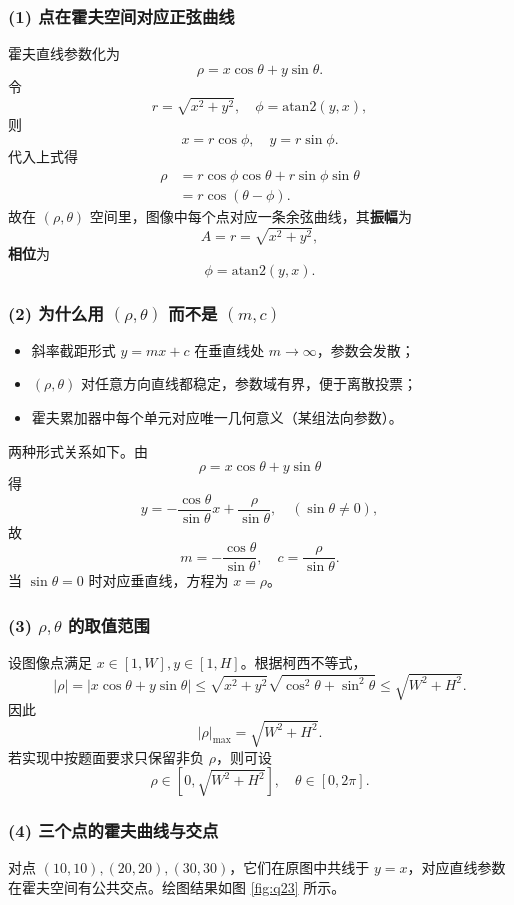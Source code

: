 \documentclass[12pt,a4paper]{ctexart}
\begin{document}
\subsubsection*{(1) 点在霍夫空间对应正弦曲线}
霍夫直线参数化为
\begin{equation}
\rho = x\cos\theta + y\sin\theta.
\end{equation}
令
\[
r=\sqrt{x^2+y^2},\quad \phi=\mathrm{atan2}(y,x),
\]
则
\[
x=r\cos\phi,\quad y=r\sin\phi.
\]
代入上式得
\begin{align}
\rho &= r\cos\phi\cos\theta + r\sin\phi\sin\theta \\
&= r\cos(\theta-\phi).
\end{align}
故在 $(\rho,\theta)$ 空间里，图像中每个点对应一条余弦曲线，其\textbf{振幅}为
\[
A=r=\sqrt{x^2+y^2},
\]
\textbf{相位}为
\[
\phi=\mathrm{atan2}(y,x).
\]

\subsubsection*{(2) 为什么用 $(\rho,\theta)$ 而不是 $(m,c)$}
\begin{itemize}
    \item 斜率截距形式 $y=mx+c$ 在垂直线处 $m\to\infty$，参数会发散；
    \item $(\rho,\theta)$ 对任意方向直线都稳定，参数域有界，便于离散投票；
    \item 霍夫累加器中每个单元对应唯一几何意义（某组法向参数）。
\end{itemize}

两种形式关系如下。由
\[
\rho = x\cos\theta + y\sin\theta
\]
得
\[
y = -\frac{\cos\theta}{\sin\theta}x + \frac{\rho}{\sin\theta},\quad (\sin\theta\neq 0),
\]
故
\[
m=-\frac{\cos\theta}{\sin\theta},\quad c=\frac{\rho}{\sin\theta}.
\]
当 $\sin\theta=0$ 时对应垂直线，方程为 $x=\rho$。

\subsubsection*{(3) $\rho,\theta$ 的取值范围}
设图像点满足 $x\in[1,W], y\in[1,H]$。根据柯西不等式，
\[
|\rho| = |x\cos\theta+y\sin\theta|
\le \sqrt{x^2+y^2}\sqrt{\cos^2\theta+\sin^2\theta}
\le \sqrt{W^2+H^2}.
\]
因此
\[
|\rho|_{\max}=\sqrt{W^2+H^2}.
\]
若实现中按题面要求只保留非负 $\rho$，则可设
\[
\rho\in[0,\sqrt{W^2+H^2}],\quad \theta\in[0,2\pi].
\]

\subsubsection*{(4) 三个点的霍夫曲线与交点}
对点 $(10,10),(20,20),(30,30)$，它们在原图中共线于 $y=x$，对应直线参数在霍夫空间有公共交点。绘图结果如图 \ref{fig:q23} 所示。
\end{document}
